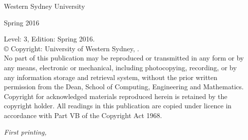 \begin{titlepage}
  \begin{center}
    {\Huge\bfseries \printsubjectname{} \par}
    \vspace{1cm}
    {\huge Western Sydney University \par}
    \vspace{1cm}
    {\huge Spring 2016 \par}
    
  \end{center}

\vspace*{\fill}






\thispagestyle{empty}

\vfill

{\small%
Level: 3,  Edition: Spring 2016. \\[0.5em]
\copyright{} Copyright: University of Western Sydney, \the\year. \\[0.5em]
No part of this publication may be reproduced or transmitted in any
form or by any means, electronic or mechanical, including
photocopying, recording, or by any information storage and retrieval
system, without the prior written permission from the Dean, School of
Computing, Engineering and Mathematics. Copyright for acknowledged
materials reproduced herein is retained by the copyright holder. All
readings in this publication are copied under licence in accordance
with Part VB of the Copyright Act 1968. 
}
\par\textit{First printing, \monthyear}
\end{titlepage}

\setcounter{tocdepth}{1}
\tableofcontents




